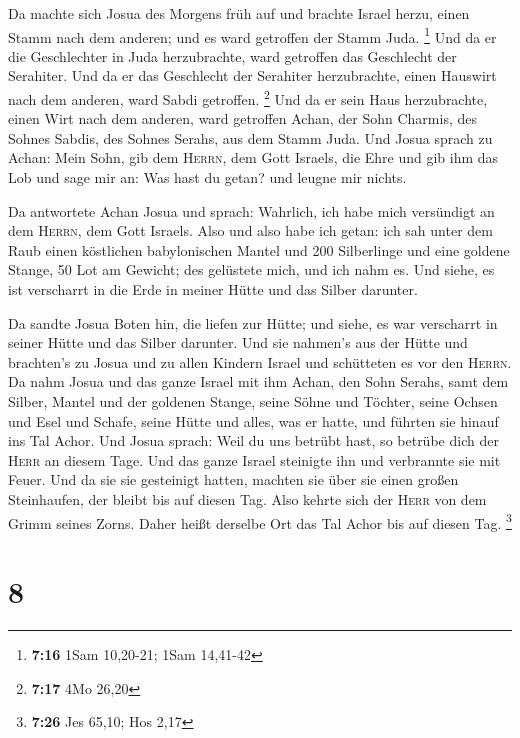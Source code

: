  Da machte sich Josua des Morgens früh auf und brachte
Israel herzu, einen Stamm nach dem anderen; und es ward getroffen der
Stamm Juda. \footnote{\textbf{7:16} 1Sam 10,20-21; 1Sam 14,41-42}
 Und da er die Geschlechter in Juda herzubrachte, ward
getroffen das Geschlecht der Serahiter. Und da er das Geschlecht der
Serahiter herzubrachte, einen Hauswirt nach dem anderen, ward Sabdi
getroffen. \footnote{\textbf{7:17} 4Mo 26,20}  Und da er
sein Haus herzubrachte, einen Wirt nach dem anderen, ward getroffen
Achan, der Sohn Charmis, des Sohnes Sabdis, des Sohnes Serahs, aus dem
Stamm Juda.  Und Josua sprach zu Achan: Mein Sohn, gib
dem \textsc{Herrn}, dem Gott Israels, die Ehre und gib ihm das Lob und
sage mir an: Was hast du getan? und leugne mir nichts.

 Da antwortete Achan Josua und sprach: Wahrlich, ich habe
mich versündigt an dem \textsc{Herrn}, dem Gott Israels. Also und also
habe ich getan:  ich sah unter dem Raub einen köstlichen
babylonischen Mantel und 200 Silberlinge und eine goldene Stange, 50 Lot
am Gewicht; des gelüstete mich, und ich nahm es. Und siehe, es ist
verscharrt in die Erde in meiner Hütte und das Silber darunter.

 Da sandte Josua Boten hin, die liefen zur Hütte; und
siehe, es war verscharrt in seiner Hütte und das Silber darunter.
 Und sie nahmen's aus der Hütte und brachten's zu Josua
und zu allen Kindern Israel und schütteten es vor den \textsc{Herrn}.
 Da nahm Josua und das ganze Israel mit ihm Achan, den
Sohn Serahs, samt dem Silber, Mantel und der goldenen Stange, seine
Söhne und Töchter, seine Ochsen und Esel und Schafe, seine Hütte und
alles, was er hatte, und führten sie hinauf ins Tal Achor.
 Und Josua sprach: Weil du uns betrübt hast, so betrübe
dich der \textsc{Herr} an diesem Tage. Und das ganze Israel steinigte
ihn und verbrannte sie mit Feuer. Und da sie sie gesteinigt hatten,
 machten sie über sie einen großen Steinhaufen, der
bleibt bis auf diesen Tag. Also kehrte sich der \textsc{Herr} von dem
Grimm seines Zorns. Daher heißt derselbe Ort das Tal Achor bis auf
diesen Tag. \footnote{\textbf{7:26} Jes 65,10; Hos 2,17}

\hypertarget{section-2}{%
\section{8}\label{section-2}}

